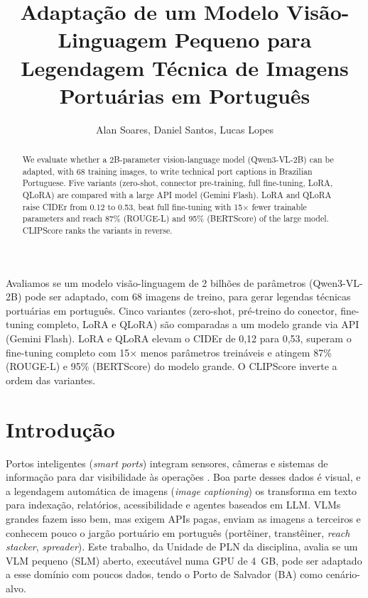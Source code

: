 \documentclass[12pt]{article}
\title{Adaptação de um Modelo Visão-Linguagem Pequeno para Legendagem
Técnica de Imagens Portuárias em Português}
\author{Alan Soares, Daniel Santos, Lucas Lopes}
\begin{document}
\maketitle

\begin{abstract}
We evaluate whether a 2B-parameter vision-language model (Qwen3-VL-2B) can be
adapted, with 68 training images, to write technical port captions in
Brazilian Portuguese. Five variants (zero-shot, connector pre-training, full
fine-tuning, LoRA, QLoRA) are compared with a large API model (Gemini Flash).
LoRA and QLoRA raise CIDEr from 0.12 to 0.53, beat full fine-tuning with
15$\times$ fewer trainable parameters and reach 87\% (ROUGE-L) and 95\%
(BERTScore) of the large model. CLIPScore ranks the variants in reverse.
\end{abstract}

\begin{resumo}
Avaliamos se um modelo visão-linguagem de 2 bilhões de parâmetros
(Qwen3-VL-2B) pode ser adaptado, com 68 imagens de treino, para gerar
legendas técnicas portuárias em português. Cinco variantes (zero-shot,
pré-treino do conector, fine-tuning completo, LoRA e QLoRA) são comparadas a
um modelo grande via API (Gemini Flash). LoRA e QLoRA elevam o CIDEr de 0,12
para 0,53, superam o fine-tuning completo com 15$\times$ menos parâmetros
treináveis e atingem 87\% (ROUGE-L) e 95\% (BERTScore) do modelo grande.
O CLIPScore inverte a ordem das variantes.
\end{resumo}

\section{Introdução}

Portos inteligentes (\textit{smart ports}) integram sensores, câmeras e
sistemas de informação para dar visibilidade às operações
\cite{molavi2020,yang2018}. Boa parte desses dados é visual, e a legendagem
automática de imagens (\textit{image captioning}) os transforma em texto
para indexação, relatórios, acessibilidade e agentes baseados em LLM. VLMs
grandes fazem isso bem, mas exigem APIs pagas, enviam as imagens a terceiros
e conhecem pouco o jargão portuário em português (portêiner, transtêiner,
\textit{reach stacker}, \textit{spreader}). Este trabalho, da Unidade de PLN
da disciplina, avalia se um VLM pequeno (SLM) aberto, executável numa GPU de
4~GB, pode ser adaptado a esse domínio com poucos dados, tendo o Porto de
Salvador (BA) como cenário-alvo.
\end{document}
